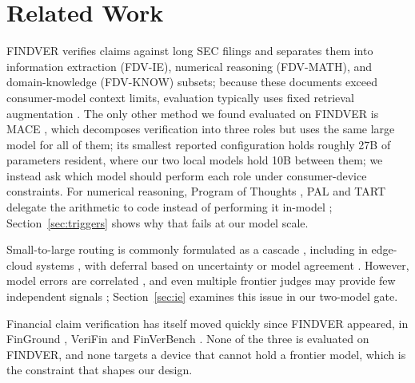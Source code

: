\documentclass{article}
\begin{document}
\section{Related Work}
\label{sec:related}

FINDVER \citep{zhao2024findver} verifies claims against long SEC filings and separates them into information extraction (FDV-IE), numerical reasoning (FDV-MATH), and domain-knowledge (FDV-KNOW) subsets; because these documents exceed consumer-model context limits, evaluation typically uses fixed retrieval augmentation \citep{lewis2020rag}. The only other method we found evaluated on FINDVER is MACE \citep{saha2026mace}, which decomposes verification into three roles but uses the same large model for all of them; its smallest reported configuration holds roughly 27B of parameters resident, where our two local models hold 10B between them; we instead ask which model should perform each role under consumer-device constraints. For numerical reasoning, Program of Thoughts \citep{chen2022pot}, PAL \citep{gao2022pal} and TART \citep{lu2025tart} delegate the arithmetic to code instead of performing it in-model \citep{wei2022cot}; Section~\ref{sec:triggers} shows why that fails at our model scale.

Small-to-large routing is commonly formulated as a cascade \citep{moslem2026routing}, including in edge-cloud systems \citep{li2025collaborative}, with deferral based on uncertainty \citep{kotte2026ucci} or model agreement \citep{kolawole2025agreement,soiffer2025semantic}. However, model errors are correlated \citep{kim2025correlated}, and even multiple frontier judges may provide few independent signals \citep{kohli2026judges}; Section~\ref{sec:ie} examines this issue in our two-model gate.

Financial claim verification has itself moved quickly since FINDVER appeared, in FinGround \citep{guo2026finground}, VeriFin \citep{hall2026verifin} and FinVerBench \citep{panda2026finverbench}. None of the three is evaluated on FINDVER, and none targets a device that cannot hold a frontier model, which is the constraint that shapes our design.
\end{document}

